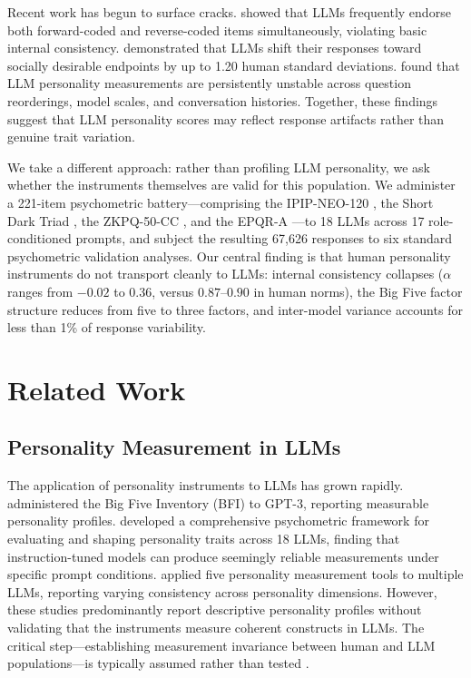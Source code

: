 \documentclass[11pt]{article}
\begin{document}
Recent work has begun to surface cracks. \citet{suhr2025challenging} showed that LLMs frequently endorse both forward-coded and reverse-coded items simultaneously, violating basic internal consistency. \citet{acerbi2024llm} demonstrated that LLMs shift their responses toward socially desirable endpoints by up to 1.20 human standard deviations. \citet{pelet2025persistent} found that LLM personality measurements are persistently unstable across question reorderings, model scales, and conversation histories. Together, these findings suggest that LLM personality scores may reflect response artifacts rather than genuine trait variation.

We take a different approach: rather than profiling LLM personality, we ask whether the instruments themselves are valid for this population. We administer a 221-item psychometric battery---comprising the IPIP-NEO-120 \citep{johnson2014measuring}, the Short Dark Triad \citep{jones2014introducing}, the ZKPQ-50-CC \citep{aluja2006cross}, and the EPQR-A \citep{francis1992development}---to 18 LLMs across 17 role-conditioned prompts, and subject the resulting 67,626 responses to six standard psychometric validation analyses. Our central finding is that human personality instruments do not transport cleanly to LLMs: internal consistency collapses ($\alpha$ ranges from $-0.02$ to $0.36$, versus $0.87$--$0.90$ in human norms), the Big Five factor structure reduces from five to three factors, and inter-model variance accounts for less than 1\% of response variability.

\section{Related Work}

\subsection{Personality Measurement in LLMs}

The application of personality instruments to LLMs has grown rapidly. \citet{miotto2023gpt3} administered the Big Five Inventory (BFI) to GPT-3, reporting measurable personality profiles. \citet{serapio2025psychometric} developed a comprehensive psychometric framework for evaluating and shaping personality traits across 18 LLMs, finding that instruction-tuned models can produce seemingly reliable measurements under specific prompt conditions. \citet{bhandari2025evaluating} applied five personality measurement tools to multiple LLMs, reporting varying consistency across personality dimensions. However, these studies predominantly report descriptive personality profiles without validating that the instruments measure coherent constructs in LLMs. The critical step---establishing measurement invariance between human and LLM populations---is typically assumed rather than tested \citep{suhr2025challenging}.
\end{document}

